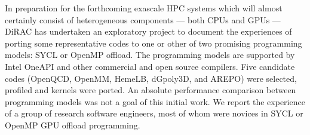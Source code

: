 
In preparation for the forthcoming exascale HPC systems which will almost certainly consist of heterogeneous components --- both CPUs and GPUs --- DiRAC has undertaken an exploratory project to document the experiences of porting some representative codes to one or other of two promising programming models: SYCL or OpenMP offload.
The programming models are supported by Intel OneAPI and other commercial and open source compilers.
Five candidate codes (OpenQCD, OpenMM, HemeLB, dGpoly3D, and AREPO) were selected, profiled and kernels were ported.
An absolute performance comparison between programming models was not a goal of this initial work.
We report the experience of a group of research software engineers, most of whom were novices in SYCL or OpenMP GPU offload programming.

\newpage
